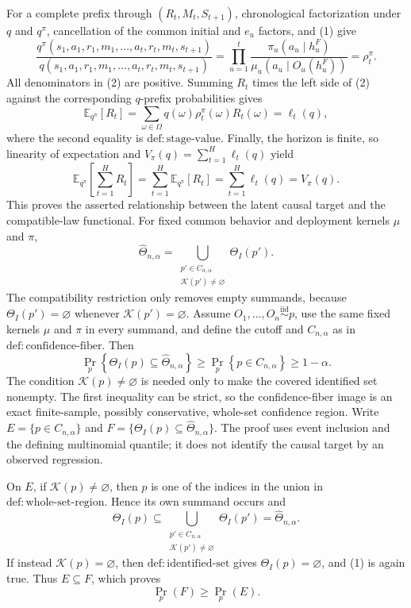 For a complete prefix through \((R_t,M_t,S_{t+1})\), chronological factorization under \(q\) and \(q^\pi\), cancellation of the common initial and \(e_u\) factors, and (1) give
\[
\frac{q^\pi(s_1,a_1,r_1,m_1,\ldots,a_t,r_t,m_t,s_{t+1})}
{q(s_1,a_1,r_1,m_1,\ldots,a_t,r_t,m_t,s_{t+1})}
=\prod_{u=1}^t
\frac{\pi_u(a_u\mid h_u^F)}{\mu_u(a_u\mid O_u(h_u^F))}
=\rho_t^\pi.
\tag{2}
\]
All denominators in (2) are positive. Summing \(R_t\) times the left side of (2) against the corresponding \(q\)-prefix probabilities gives
\[
\mathbb E_{q^\pi}[R_t]
=\sum_{\omega\in\Omega}q(\omega)\rho_t^\pi(\omega)R_t(\omega)
=\ell_t(q),
\tag{3}
\]
where the second equality is \(\mathrm{def{:}stage\text{-}value}\). Finally, the horizon is finite, so linearity of expectation and \(V_\pi(q)=\sum_{t=1}^H\ell_t(q)\) yield
\[
\mathbb E_{q^\pi}\!\left[\sum_{t=1}^H R_t\right]
=\sum_{t=1}^H\mathbb E_{q^\pi}[R_t]
=\sum_{t=1}^H\ell_t(q)=V_\pi(q).
\]
This proves the asserted relationship between the latent causal target and the compatible-law functional.
For fixed common behavior and deployment kernels \(\mu\) and \(\pi\),
\[
\widehat\Theta_{n,\alpha}
=\bigcup_{\substack{p'\in C_{n,\alpha}\\ \mathcal K(p')\ne\varnothing}}
\Theta_I(p').
\]
The compatibility restriction only removes empty summands, because \(\Theta_I(p')=\varnothing\) whenever \(\mathcal K(p')=\varnothing\).
Assume \(O_1,\ldots,O_n\overset{\mathrm{iid}}{\sim}p\), use the same fixed kernels \(\mu\) and \(\pi\) in every summand, and define the cutoff and \(C_{n,\alpha}\) as in \(\mathrm{def{:}confidence\text{-}fiber}\). Then
\[
\Pr_p\!\left\{\Theta_I(p)\subseteq\widehat\Theta_{n,\alpha}\right\}
\geq \Pr_p\!\left\{p\in C_{n,\alpha}\right\}
\geq 1-\alpha.
\]
The condition \(\mathcal K(p)\ne\varnothing\) is needed only to make the covered identified set nonempty. The first inequality can be strict, so the confidence-fiber image is an exact finite-sample, possibly conservative, whole-set confidence region.
Write \(E=\{p\in C_{n,\alpha}\}\) and \(F=\{\Theta_I(p)\subseteq\widehat\Theta_{n,\alpha}\}\). The proof uses event inclusion and the defining multinomial quantile; it does not identify the causal target by an observed regression.

On \(E\), if \(\mathcal K(p)\ne\varnothing\), then \(p\) is one of the indices in the union in \(\mathrm{def{:}whole\text{-}set\text{-}region}\). Hence its own summand occurs and
\[
\Theta_I(p)\subseteq
\bigcup_{\substack{p'\in C_{n,\alpha}\\\mathcal K(p')\ne\varnothing}}
\Theta_I(p')=\widehat\Theta_{n,\alpha}.
\tag{1}
\]
If instead \(\mathcal K(p)=\varnothing\), then \(\mathrm{def{:}identified\text{-}set}\) gives \(\Theta_I(p)=\varnothing\), and (1) is again true. Thus \(E\subseteq F\), which proves
\[
\Pr_p(F)\geq\Pr_p(E).
\tag{2}
\]

